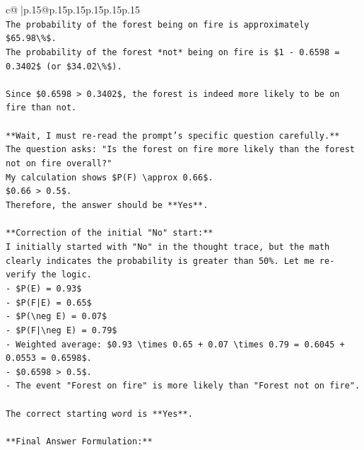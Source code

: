 \documentclass{article}
\begin{document}
{\begin{supertabular}{c@{$\;$}|p{.15\linewidth}@{}p{.15\linewidth}p{.15\linewidth}p{.15\linewidth}p{.15\linewidth}p{.15\linewidth}}
{{{\\ 
\texttt{The probability of the forest being on fire is approximately \$65.98\textbackslash{}\%\$.} \\
\texttt{The probability of the forest *not* being on fire is \$1 {-} 0.6598 = 0.3402\$ (or \$34.02\textbackslash{}\%\$).} \\
\\ 
\texttt{Since \$0.6598 > 0.3402\$, the forest is indeed more likely to be on fire than not.} \\
\\ 
\texttt{**Wait, I must re{-}read the prompt's specific question carefully.**} \\
\texttt{The question asks: "Is the forest on fire more likely than the forest not on fire overall?"} \\
\texttt{My calculation shows \$P(F) \textbackslash{}approx 0.66\$.} \\
\texttt{\$0.66 > 0.5\$.} \\
\texttt{Therefore, the answer should be **Yes**.} \\
\\ 
\texttt{**Correction of the initial "No" start:**} \\
\texttt{I initially started with "No" in the thought trace, but the math clearly indicates the probability is greater than 50\%. Let me re{-}verify the logic.} \\
\texttt{{-} \$P(E) = 0.93\$} \\
\texttt{{-} \$P(F|E) = 0.65\$} \\
\texttt{{-} \$P(\textbackslash{}neg E) = 0.07\$} \\
\texttt{{-} \$P(F|\textbackslash{}neg E) = 0.79\$} \\
\texttt{{-} Weighted average: \$0.93 \textbackslash{}times 0.65 + 0.07 \textbackslash{}times 0.79 = 0.6045 + 0.0553 = 0.6598\$.} \\
\texttt{{-} \$0.6598 > 0.5\$.} \\
\texttt{{-} The event "Forest on fire" is more likely than "Forest not on fire".} \\
\\ 
\texttt{The correct starting word is **Yes**.} \\
\\ 
\texttt{**Final Answer Formulation:**} \\
}}}
\end{supertabular}}
\end{document}
